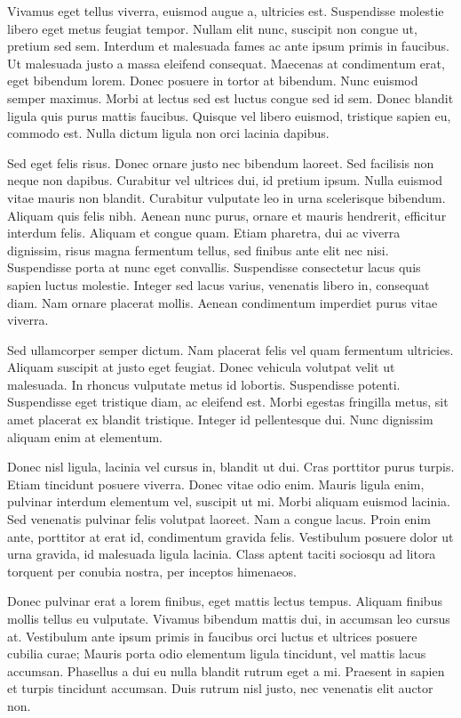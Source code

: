 \documentclass{homework}
\begin{document}
Vivamus eget tellus viverra, euismod augue a, ultricies est. Suspendisse molestie libero eget metus feugiat tempor. Nullam elit nunc, suscipit non congue ut, pretium sed sem. Interdum et malesuada fames ac ante ipsum primis in faucibus. Ut malesuada justo a massa eleifend consequat. Maecenas at condimentum erat, eget bibendum lorem. Donec posuere in tortor at bibendum. Nunc euismod semper maximus. Morbi at lectus sed est luctus congue sed id sem. Donec blandit ligula quis purus mattis faucibus. Quisque vel libero euismod, tristique sapien eu, commodo est. Nulla dictum ligula non orci lacinia dapibus.

Sed eget felis risus. Donec ornare justo nec bibendum laoreet. Sed facilisis non neque non dapibus. Curabitur vel ultrices dui, id pretium ipsum. Nulla euismod vitae mauris non blandit. Curabitur vulputate leo in urna scelerisque bibendum. Aliquam quis felis nibh. Aenean nunc purus, ornare et mauris hendrerit, efficitur interdum felis. Aliquam et congue quam. Etiam pharetra, dui ac viverra dignissim, risus magna fermentum tellus, sed finibus ante elit nec nisi. Suspendisse porta at nunc eget convallis. Suspendisse consectetur lacus quis sapien luctus molestie. Integer sed lacus varius, venenatis libero in, consequat diam. Nam ornare placerat mollis. Aenean condimentum imperdiet purus vitae viverra.

Sed ullamcorper semper dictum. Nam placerat felis vel quam fermentum ultricies. Aliquam suscipit at justo eget feugiat. Donec vehicula volutpat velit ut malesuada. In rhoncus vulputate metus id lobortis. Suspendisse potenti. Suspendisse eget tristique diam, ac eleifend est. Morbi egestas fringilla metus, sit amet placerat ex blandit tristique. Integer id pellentesque dui. Nunc dignissim aliquam enim at elementum.

Donec nisl ligula, lacinia vel cursus in, blandit ut dui. Cras porttitor purus turpis. Etiam tincidunt posuere viverra. Donec vitae odio enim. Mauris ligula enim, pulvinar interdum elementum vel, suscipit ut mi. Morbi aliquam euismod lacinia. Sed venenatis pulvinar felis volutpat laoreet. Nam a congue lacus. Proin enim ante, porttitor at erat id, condimentum gravida felis. Vestibulum posuere dolor ut urna gravida, id malesuada ligula lacinia. Class aptent taciti sociosqu ad litora torquent per conubia nostra, per inceptos himenaeos.

Donec pulvinar erat a lorem finibus, eget mattis lectus tempus. Aliquam finibus mollis tellus eu vulputate. Vivamus bibendum mattis dui, in accumsan leo cursus at. Vestibulum ante ipsum primis in faucibus orci luctus et ultrices posuere cubilia curae; Mauris porta odio elementum ligula tincidunt, vel mattis lacus accumsan. Phasellus a dui eu nulla blandit rutrum eget a mi. Praesent in sapien et turpis tincidunt accumsan. Duis rutrum nisl justo, nec venenatis elit auctor non.
\end{document}
